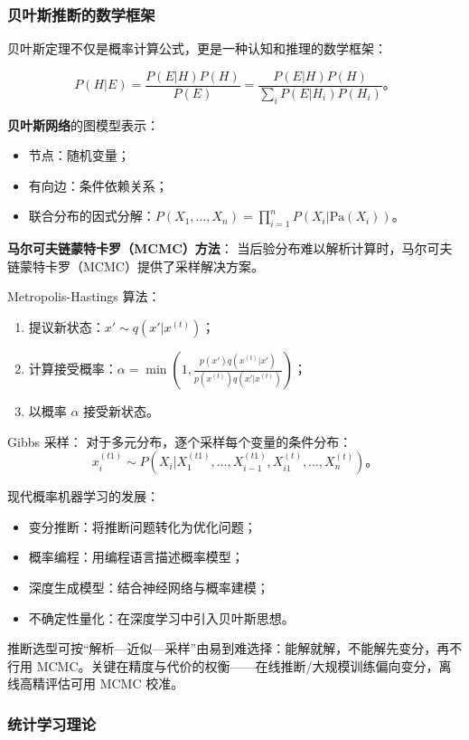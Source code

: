 \subsubsection{贝叶斯推断的数学框架}

贝叶斯定理不仅是概率计算公式，更是一种认知和推理的数学框架：

$$P(H|E) = \frac{P(E|H)P(H)}{P(E)} = \frac{P(E|H)P(H)}{\sum_i P(E|H_i)P(H_i)}。$$

\textbf{贝叶斯网络}的图模型表示：
\begin{itemize}
  \item 节点：随机变量；
  \item 有向边：条件依赖关系；
  \item 联合分布的因式分解：$P(X_1, \ldots, X_n) = \prod_{i=1}^n P(X_i|\text{Pa}(X_i))$。
\end{itemize}

\textbf{马尔可夫链蒙特卡罗（MCMC）方法}：
当后验分布难以解析计算时，马尔可夫链蒙特卡罗（MCMC）提供了采样解决方案。

Metropolis-Hastings 算法：
\begin{enumerate}
  \item 提议新状态：$x' \sim q(x'|x^{(t)})$；
  \item 计算接受概率：$\alpha = \min\left(1, \frac{p(x')q(x^{(t)}|x')}{p(x^{(t)})q(x'|x^{(t)})}\right)$；
  \item 以概率 $\alpha$ 接受新状态。
\end{enumerate}

Gibbs 采样：
对于多元分布，逐个采样每个变量的条件分布：
$$x_i^{(t1)} \sim P(X_i|X_1^{(t1)}, \ldots, X_{i-1}^{(t1)}, X_{i1}^{(t)}, \ldots, X_n^{(t)})。$$

现代概率机器学习的发展：
\begin{itemize}
  \item 变分推断：将推断问题转化为优化问题；
  \item 概率编程：用编程语言描述概率模型；
  \item 深度生成模型：结合神经网络与概率建模；
  \item 不确定性量化：在深度学习中引入贝叶斯思想。
\end{itemize}

推断选型可按“解析—近似—采样”由易到难选择：能解就解，不能解先变分，再不行用 MCMC。关键在精度与代价的权衡——在线推断/大规模训练偏向变分，离线高精评估可用 MCMC 校准。

\subsubsection{统计学习理论}

